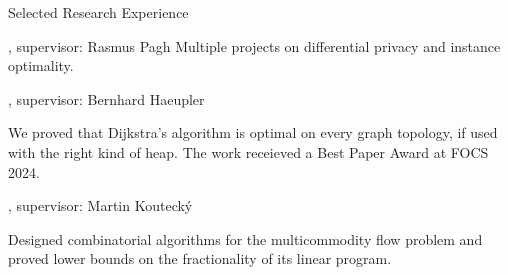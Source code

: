 \sekce Selected Research Experience

, supervisor: Rasmus Pagh
\: Multiple projects on differential privacy and instance optimality.
\endlist

, supervisor: Bernhard Haeupler

\: We proved that Dijkstra's algorithm is optimal on every graph topology, if used with the right kind of heap. The work receieved a Best Paper Award at FOCS 2024.
\endlist

%

, supervisor: Martin Koutecký

%
\: Designed combinatorial algorithms for the multicommodity flow problem and proved lower bounds on the fractionality of its linear program.
\endlist


